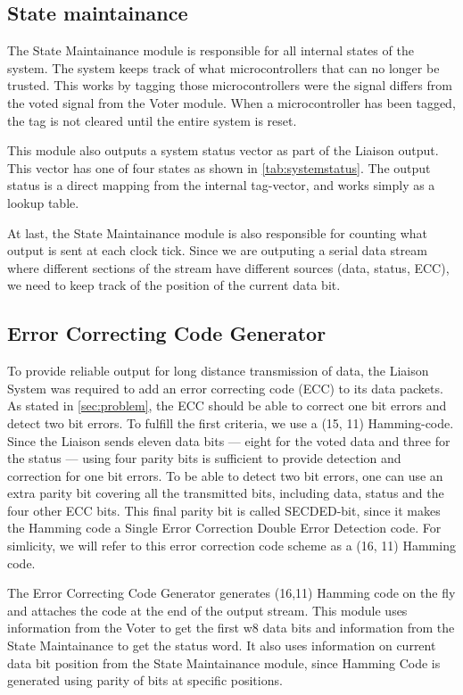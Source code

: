 \subsection{State maintainance}
The State Maintainance module is responsible for all internal states
of the system. The system keeps track of what microcontrollers that
can no longer be trusted. This works by tagging those microcontrollers
were the signal differs from the voted signal from the Voter
module. When a microcontroller has been tagged, the tag is not cleared
until the entire system is reset.

This module also outputs a system status vector as part of the Liaison
output. This vector has one of four states as shown in
\autoref{tab:systemstatus}.  The output status is a direct mapping
from the internal tag-vector, and works simply as a lookup table.

At last, the State Maintainance module is also responsible for
counting what output is sent at each clock tick. Since we are
outputing a serial data stream where different sections of the stream
have different sources (data, status, ECC), we need to keep track of
the position of the current data bit.



\subsection{Error Correcting Code Generator}
To provide reliable output for long distance transmission of data, the
Liaison System was required to add an error correcting code (ECC) to
its data packets. As stated in \autoref{sec:problem}, the ECC should
be able to correct one bit errors and detect two bit errors. To
fulfill the first criteria, we use a (15, 11)
Hamming-code\cite{ecc}. Since the Liaison sends eleven data bits ---
eight for the voted data and three for the status --- using four
parity bits is sufficient to provide detection and correction for one
bit errors. To be able to detect two bit errors, one can use an extra
parity bit covering all the transmitted bits, including data, status
and the four other ECC bits. This final parity bit is called
SECDED-bit, since it makes the Hamming code a Single Error Correction
Double Error Detection code\cite{ecc}. For simlicity, we will refer to
this error correction code scheme as a (16, 11) Hamming code.

The Error Correcting Code Generator generates (16,11) Hamming code on
the fly and attaches the code at the end of the output stream. This
module uses information from the Voter to get the first w8 data bits
and information from the State Maintainance to get the status word. It
also uses information on current data bit position from the State
Maintainance module, since Hamming Code is generated using parity of
bits at specific positions\cite{ecc}.

